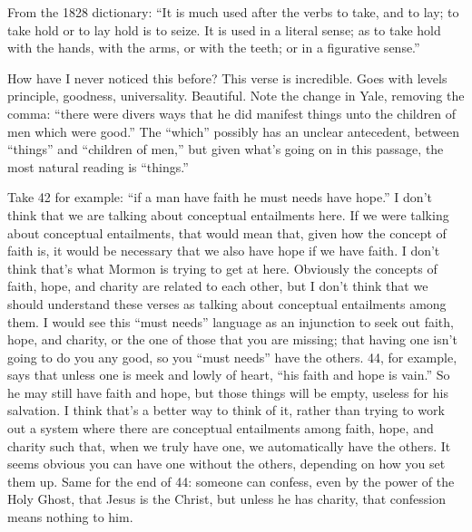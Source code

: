 		\begin{compactdesc}
		
		\item[19$\vert$]
		\begin{compactdesc}
		\item[lay hold] From the 1828 dictionary: ``It is much used after the verbs to take, and to lay; to take hold or to lay hold is to seize. It is used in a literal sense; as to take hold with the hands, with the arms, or with the teeth; or in a figurative sense.''
		\end{compactdesc}
		
		\item[24$\vert$] %
		\begin{compactdesc}
		\item[there were divers ways...] How have I never noticed this before? This verse is incredible. Goes with levels principle, goodness, universality. Beautiful. 
			Note the change in Yale, removing the comma: ``there were divers ways that he did manifest things unto the children of men which were good.'' The ``which'' possibly has an unclear antecedent, between ``things'' and ``children of men,'' but given what's going on in this passage, the most natural reading is ``things.''
		\end{compactdesc}
		
		\item[42--44$\vert$]
		\begin{compactdesc}
		\item[must needs] Take 42 for example: ``if a man have faith he must needs have hope.'' I don't think that we are talking about conceptual entailments here. If we were talking about conceptual entailments, that would mean that, given how the concept of faith is, it would be necessary that we also have hope if we have faith. I don't think that's what Mormon is trying to get at here. Obviously the concepts of faith, hope, and charity are related to each other, but I don't think that we should understand these verses as talking about conceptual entailments among them. I would see this ``must needs'' language as an injunction to seek out faith, hope, and charity, or the one of those that you are missing; that having one isn't going to do you any good, so you ``must needs'' have the others. 44, for example, says that unless one is meek and lowly of heart, ``his faith and hope is vain.'' So he may still have faith and hope, but those things will be empty, useless for his salvation. I think that's a better way to think of it, rather than trying to work out a system where there are conceptual entailments among faith, hope, and charity such that, when we truly have one, we automatically have the others. It seems obvious you can have one without the others, depending on how you set them up.
		Same for the end of 44: someone can confess, even by the power of the Holy Ghost, that Jesus is the Christ, but unless he has charity, that confession means nothing to him.
		\end{compactdesc}
		

\end{compactdesc}
